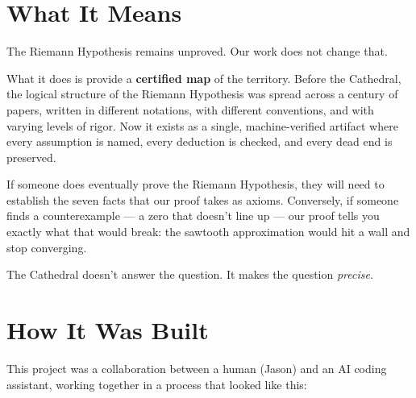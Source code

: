 \documentclass[12pt,a4paper]{article}
\begin{document}
\section*{What It Means}

The Riemann Hypothesis remains unproved. Our work does not change that.

What it does is provide a \textbf{certified map} of the territory.
Before the Cathedral, the logical structure of the Riemann Hypothesis
was spread across a century of papers, written in different notations,
with different conventions, and with varying levels of rigor. Now it
exists as a single, machine-verified artifact where every assumption is
named, every deduction is checked, and every dead end is preserved.

If someone does eventually prove the Riemann Hypothesis, they will need
to establish the seven facts that our proof takes as axioms. Conversely,
if someone finds a counterexample --- a zero that doesn't line up ---
our proof tells you exactly what that would break: the sawtooth
approximation would hit a wall and stop converging.

The Cathedral doesn't answer the question. It makes the question
\emph{precise}.

\section*{How It Was Built}

This project was a collaboration between a human (Jason) and an AI
coding assistant, working together in a process that looked like this:
\end{document}
